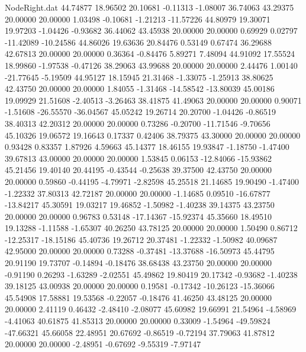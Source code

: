 \begin{filecontents}{NodeRight.dat}
  44.74877   18.96502   20.10681    -0.11313   -1.08007   36.74063   43.29375   20.00000   20.00000    1.03498   -0.10681   -1.21213  -11.57226
  44.80979   19.30071   19.97203    -1.04426   -0.93682   36.44062   43.45938   20.00000   20.00000    0.69929    0.02797  -11.42089  -10.24586
  44.86026   19.63636   20.84476     0.53149    0.67474   36.29688   42.67813   20.00000   20.00000    0.36364   -0.84476    5.89271    7.48094
  44.91092   17.55524   18.99860    -1.97538   -0.47126   38.29063   43.99688   20.00000   20.00000    2.44476    1.00140  -21.77645   -5.19509
  44.95127   18.15945   21.31468    -1.33075   -1.25913   38.80625   42.43750   20.00000   20.00000    1.84055   -1.31468  -14.58542  -13.80039
  45.00186   19.09929   21.51608    -2.40513   -3.26463   38.41875   41.49063   20.00000   20.00000    0.90071   -1.51608  -26.55570  -36.04567
  45.05242   19.26714   20.20700    -1.04426   -0.86519   38.40313   42.20312   20.00000   20.00000    0.73286   -0.20700  -11.71546   -9.70656
  45.10326   19.06572   19.16643     0.17337    0.42406   38.79375   43.30000   20.00000   20.00000    0.93428    0.83357    1.87926    4.59663
  45.14377   18.46155   19.93847    -1.18750   -1.47400   39.67813   43.00000   20.00000   20.00000    1.53845    0.06153  -12.84066  -15.93862
  45.21456   19.40140   20.44195    -0.43544   -0.25638   39.37500   42.43750   20.00000   20.00000    0.59860   -0.44195   -4.79971   -2.82598
  45.25518   21.14685   19.90490    -1.47400   -1.22332   37.80313   42.72187   20.00000   20.00000   -1.14685    0.09510  -16.67877  -13.84217
  45.30591   19.03217   19.46852    -1.50982   -1.40238   39.14375   43.23750   20.00000   20.00000    0.96783    0.53148  -17.14367  -15.92374
  45.35660   18.49510   19.13288    -1.11588   -1.65307   40.26250   43.78125   20.00000   20.00000    1.50490    0.86712  -12.25317  -18.15186
  45.40736   19.26712   20.37481    -1.22332   -1.50982   40.09687   42.95000   20.00000   20.00000    0.73288   -0.37481  -13.37688  -16.50973
  45.44795   20.91190   19.73707    -0.14894   -0.18476   38.68438   43.23750   20.00000   20.00000   -0.91190    0.26293   -1.63289   -2.02551
  45.49862   19.80419   20.17342    -0.93682   -1.40238   39.18125   43.00938   20.00000   20.00000    0.19581   -0.17342  -10.26123  -15.36066
  45.54908   17.58881   19.53568    -0.22057   -0.18476   41.46250   43.48125   20.00000   20.00000    2.41119    0.46432   -2.48410   -2.08077
  45.60982   19.66991   21.54964    -4.58969   -4.41063   40.61875   41.85313   20.00000   20.00000    0.33009   -1.54964  -49.59824  -47.66321
  45.66058   22.48951   20.67692    -0.86519   -0.72194   37.79063   41.87812   20.00000   20.00000   -2.48951   -0.67692   -9.55319   -7.97147

\end{filecontents}
